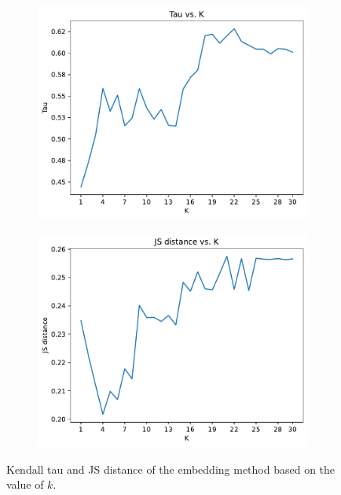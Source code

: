 \begin{figure}[H]
    \centering
    \begin{subfigure}{.5\textwidth}
      \centering
      \includegraphics[width=\linewidth]{obrazky-figures/tau_vs_k30.pdf}
      \caption{}
      \label{fig:tau_vs_k}
    \end{subfigure}%
    \begin{subfigure}{.5\textwidth}
      \centering
      \includegraphics[width=\linewidth]{obrazky-figures/js_vs_k30.pdf}
      \caption{}
      \label{fig:js_vs_k}
    \end{subfigure}
    \caption{Kendall tau and JS distance of the embedding method based on the value of $k$.}
    \label{fig:tau_js_vs_k}
\end{figure}


